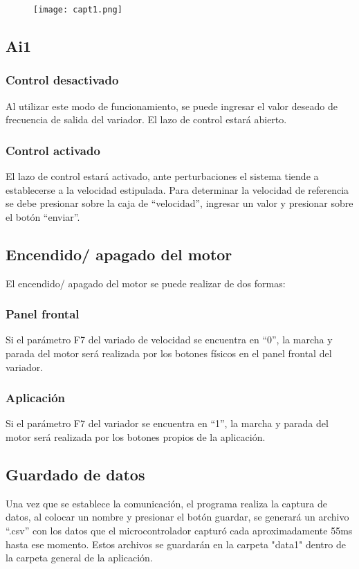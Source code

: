 \begin{figure}[htb]
	\centering
	\texttt{[image: capt1.png]}
	\label{fig:autof1}
\end{figure}





\subsection{Ai1}
\subsubsection{Control desactivado}
Al utilizar este modo de funcionamiento, se puede ingresar el valor deseado de frecuencia de salida del variador. El lazo de control estará abierto.

\subsubsection{Control activado}
El lazo de control estará activado, ante perturbaciones el sistema tiende a establecerse a la velocidad estipulada. Para determinar la velocidad de referencia se debe presionar sobre la caja de “velocidad”, ingresar un valor y presionar sobre el botón “enviar”.

\subsection{Encendido/ apagado del motor}
El encendido/ apagado del motor se puede realizar de dos formas:
\subsubsection{Panel frontal}
Si el parámetro F7 del variado de velocidad se encuentra en “0”, la marcha y parada del motor será realizada por los botones físicos en el panel frontal del variador.
\subsubsection{Aplicación}
Si el parámetro F7 del variador se encuentra en “1”, la marcha y parada del motor será realizada por los botones propios de la aplicación.


\subsection{Guardado de datos}
Una vez que se establece la comunicación, el programa realiza la captura de datos, al colocar un nombre y presionar el botón guardar, se generará un archivo “.csv” con los datos que el microcontrolador capturó cada aproximadamente 55ms hasta ese momento. Estos archivos se guardarán en la carpeta "data1{}" dentro de la carpeta general de la aplicación. 


